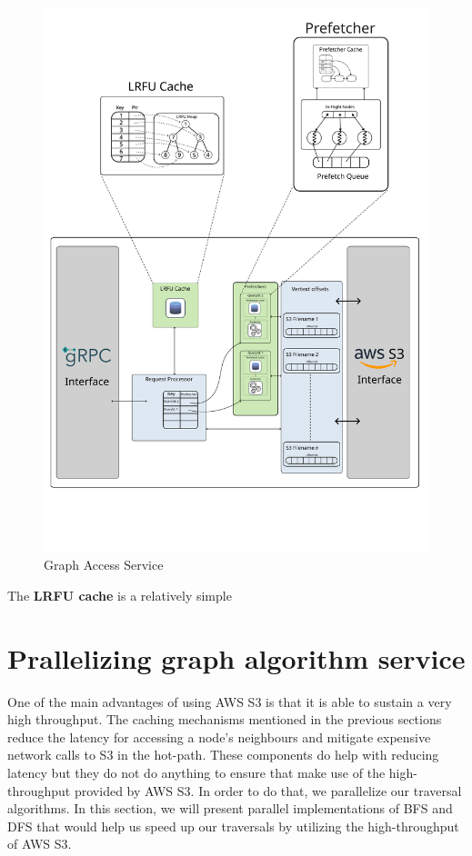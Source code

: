 \begin{figure}[ht]
    \centering
    \includegraphics[width=\textwidth]{figures/graphAccessServiceFinal.png}
    \caption{Graph Access Service}
    \label{fig:graphAccessArch}
\end{figure}

\medskip
The \textbf{LRFU cache} is a relatively simple 

\section{Prallelizing graph algorithm service}\label{sec:parallelAlgorithms}
One of the main advantages of using AWS S3 is that it is able to sustain a very
high throughput. The caching mechanisms mentioned in the previous sections
reduce the latency for accessing a node's neighbours and mitigate expensive
network calls to S3 in the hot-path. These components do help with reducing
latency but they do not do anything to ensure that make use of the
high-throughput provided by AWS S3. In order to do that, we parallelize our
traversal algorithms. In this section, we will present parallel implementations
of BFS and DFS that would help us speed up our traversals by utilizing the
high-throughput of AWS S3.

